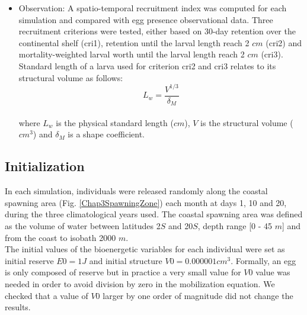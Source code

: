 \begin{itemize}

\item Observation: A spatio-temporal recruitment index was computed for each simulation and compared with egg presence observational data. Three recruitment criterions were tested, either based on 30-day retention over the continental shelf (\gls{cri1}), retention until the larval length reach 2 $cm$ (\gls{cri2}) and mortality-weighted larval worth until the larval length reach 2 $cm$ (\gls{cri3}). Standard length of a larva used for criterion \gls{cri2} and \gls{cri3} relates to its structural volume as follows:\\

\begin{equation}
	L_{w} = \frac
				{V^{1/3}}
				{\delta_{M}}
	\label{L_W}
\end{equation}\\

where $L_{w}$ is the physical standard length ($cm$), $V$ is the structural volume ($cm^3$) 
and $\delta_{M}$ is a shape coefficient.\\

\end{itemize}

\subsection{Initialization}
In each simulation, individuals were released randomly along the coastal spawning area (Fig. \ref{Chap3SpawningZone}) each month at days 1, 10 and 20, during the three climatological years used. The coastal spawning area was defined as the volume of water between latitudes 2\textdegree $S$ and 20\textdegree $S$, depth range [0 - 45 $m$] and from the coast to isobath 2000 $m$.\\

The initial values of the bioenergetic variables for each individual were set as initial reserve $E0=1J$ and initial structure $V0=0.000001cm^3$. Formally, an egg is only composed of reserve but in practice a very small value for $V0$ value was needed in order to avoid division by zero in the mobilization equation. We checked that a value of $V0$ larger by one order of magnitude did not change the results.\\

